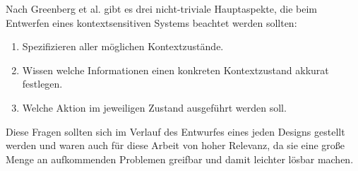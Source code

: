 Nach Greenberg et al. \cite{greenberg2001context} gibt es drei nicht-triviale Hauptaspekte, die beim Entwerfen eines kontextsensitiven Systems beachtet werden sollten:
\begin{enumerate}
\item{Spezifizieren aller möglichen Kontextzustände.}
\item{Wissen welche Informationen einen konkreten Kontextzustand akkurat festlegen.}
\item{Welche Aktion im jeweiligen Zustand ausgeführt werden soll.}
\end{enumerate}
Diese Fragen sollten sich im Verlauf des Entwurfes eines jeden Designs gestellt werden und waren auch für diese Arbeit von hoher Relevanz, da sie eine große Menge an aufkommenden Problemen greifbar und damit leichter lösbar machen. 

